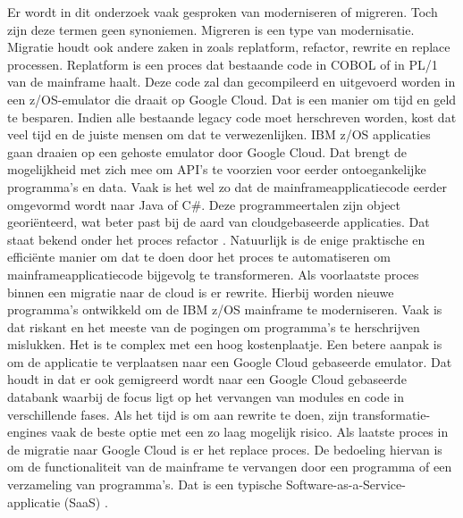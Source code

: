 Er wordt in dit onderzoek vaak gesproken van moderniseren of migreren. Toch zijn deze termen geen synoniemen. Migreren is een type van modernisatie. Migratie houdt ook andere zaken in zoals replatform, refactor, rewrite en replace processen. Replatform is een proces dat bestaande code in COBOL of in PL/1 van de mainframe haalt. Deze code zal dan gecompileerd en uitgevoerd worden in een z/OS-emulator die draait op Google Cloud. Dat is een manier om tijd en geld te besparen. Indien alle bestaande legacy code moet herschreven worden, kost dat veel tijd en de juiste mensen om dat te verwezenlijken. IBM z/OS applicaties gaan draaien op een gehoste emulator door Google Cloud. Dat brengt de mogelijkheid met zich mee om API's te voorzien voor eerder ontoegankelijke programma's en data. Vaak is het wel zo dat de  mainframeapplicatiecode eerder omgevormd wordt naar Java of C\#. Deze programmeertalen zijn object georiënteerd, wat beter past bij de aard van cloudgebaseerde applicaties. Dat staat bekend onder het proces refactor \autocite{Astadia2021}. Natuurlijk is de enige praktische en efficiënte manier om dat te doen door het proces te automatiseren om mainframeapplicatiecode bijgevolg te transformeren. Als voorlaatste proces binnen een migratie naar de cloud is er rewrite. Hierbij worden nieuwe programma's ontwikkeld om de IBM z/OS mainframe te moderniseren. Vaak is dat riskant en het meeste van de pogingen om programma's te herschrijven mislukken. Het is te complex met een hoog kostenplaatje. Een betere aanpak is om de applicatie te verplaatsen naar een Google Cloud gebaseerde emulator. Dat houdt in dat er ook gemigreerd wordt naar een Google Cloud gebaseerde databank waarbij de focus ligt op het vervangen van modules en code in verschillende fases. Als het tijd is om aan rewrite te doen, zijn transformatie-engines vaak de beste optie met een zo laag mogelijk risico. Als laatste proces in de migratie naar Google Cloud is er het replace proces. De bedoeling hiervan is om de functionaliteit van de mainframe te vervangen door een programma of een verzameling van programma's. Dat is een typische Software-as-a-Service-applicatie (SaaS) \autocite{Astadia2021}. 

\subsection{}
\label{sec:De uitdagingen van mainframemodernisatie volgens Astadia}

